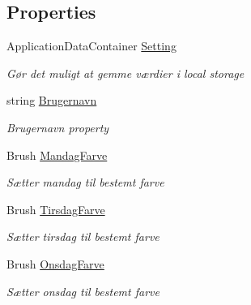 \subsection*{Properties}
\begin{DoxyCompactItemize}
\item 
Application\+Data\+Container \hyperlink{class__1aarsproeve_1_1_view_model_1_1_vagtplan_view_model_aa5e675ea6389cdc802698037ced2e091}{Setting}
\begin{DoxyCompactList}\small\item\em Gør det muligt at gemme værdier i local storage \end{DoxyCompactList}\item 
string \hyperlink{class__1aarsproeve_1_1_view_model_1_1_vagtplan_view_model_a2bb8421c370d9ff0ff1776a1c239ba4e}{Brugernavn}
\begin{DoxyCompactList}\small\item\em Brugernavn property \end{DoxyCompactList}\item 
Brush \hyperlink{class__1aarsproeve_1_1_view_model_1_1_vagtplan_view_model_ad7b9435c1500a21d04418bedeead2094}{Mandag\+Farve}
\begin{DoxyCompactList}\small\item\em Sætter mandag til bestemt farve \end{DoxyCompactList}\item 
Brush \hyperlink{class__1aarsproeve_1_1_view_model_1_1_vagtplan_view_model_adc98e55c2f01916b7581f1ef865a70bc}{Tirsdag\+Farve}
\begin{DoxyCompactList}\small\item\em Sætter tirsdag til bestemt farve \end{DoxyCompactList}\item 
Brush \hyperlink{class__1aarsproeve_1_1_view_model_1_1_vagtplan_view_model_a3c463aaf64f3e35e910640a29969943d}{Onsdag\+Farve}
\begin{DoxyCompactList}\small\item\em Sætter onsdag til bestemt farve \end{DoxyCompactList}\item 

\end{DoxyCompactItemize}
